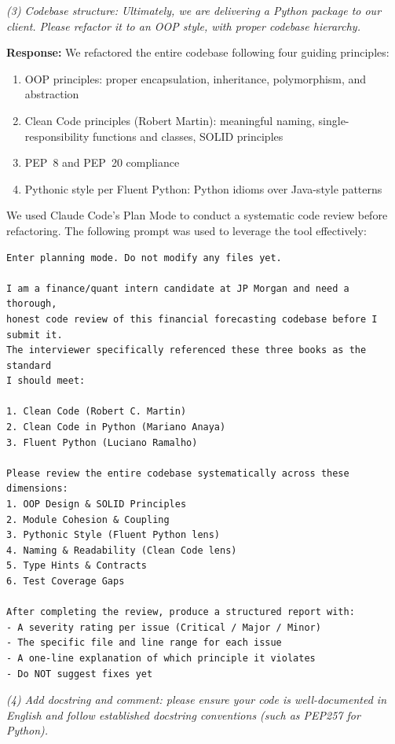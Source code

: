 \documentclass[12pt,a4paper]{article}
\begin{document}
\emph{(3) Codebase structure: Ultimately, we are delivering a Python
package to our client. Please refactor it to an OOP style, with proper
codebase hierarchy.}

\textbf{Response:} We refactored the entire codebase following four
guiding principles:

\begin{enumerate}
\item OOP principles: proper encapsulation, inheritance, polymorphism,
  and abstraction
\item Clean Code principles (Robert Martin): meaningful naming,
  single-responsibility functions and classes, SOLID principles
\item PEP~8 and PEP~20 compliance
\item Pythonic style per Fluent Python: Python idioms over Java-style
  patterns
\end{enumerate}

We used Claude Code's Plan Mode to conduct a systematic code review
before refactoring. The following prompt was used to leverage the tool
effectively:

\begin{lstlisting}[basicstyle=\ttfamily\scriptsize, breaklines=true, captionpos=b, caption={Claude Code planning-mode prompt used for systematic code review before refactoring}, label=lst:code_review_prompt]
Enter planning mode. Do not modify any files yet.

I am a finance/quant intern candidate at JP Morgan and need a thorough,
honest code review of this financial forecasting codebase before I submit it.
The interviewer specifically referenced these three books as the standard
I should meet:

1. Clean Code (Robert C. Martin)
2. Clean Code in Python (Mariano Anaya)
3. Fluent Python (Luciano Ramalho)

Please review the entire codebase systematically across these dimensions:
1. OOP Design & SOLID Principles
2. Module Cohesion & Coupling
3. Pythonic Style (Fluent Python lens)
4. Naming & Readability (Clean Code lens)
5. Type Hints & Contracts
6. Test Coverage Gaps

After completing the review, produce a structured report with:
- A severity rating per issue (Critical / Major / Minor)
- The specific file and line range for each issue
- A one-line explanation of which principle it violates
- Do NOT suggest fixes yet
\end{lstlisting}

\emph{(4) Add docstring and comment: please ensure your code is
well-documented in English and follow established docstring conventions
(such as PEP257 for Python).}
\end{document}
